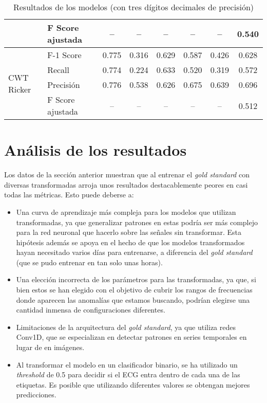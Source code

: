 \begin{table}[htbp]
{\begin{tabular}{|l|l|ccccc|c|}
		& F Score ajustada  & --    & --    & --    & --    & --    & 0.540 \\
		\midrule
		\multirow{4}{*}{CWT Ricker} 
		& F-1 Score         & 0.775    & 0.316    & 0.629    & 0.587    & 0.426    & 0.628    \\
		& Recall            & 0.774    & 0.224    & 0.633    & 0.520    & 0.319    & 0.572    \\
		& Precisión         & 0.776    & 0.538    & 0.626    & 0.675    & 0.639    & 0.696    \\
		& F Score ajustada  & --    & --    & --   & --    & --    & 0.512    \\
		\bottomrule
	\end{tabular}
	}
	\caption{Resultados de los modelos (con tres dígitos decimales de precisión)}
	\label{tab:resultados_modelos}
\end{table}

\section{Análisis de los resultados}
Los datos de la sección anterior muestran que al entrenar el \emph{gold standard} con diversas transformadas arroja unos resultados destacablemente peores en casi todas las métricas. Esto puede deberse a:
\begin{itemize}
	\item Una curva de aprendizaje más compleja para los modelos que utilizan transformadas, ya que generalizar patrones en estas podría ser más complejo para la red neuronal que hacerlo sobre las señales sin transformar. Esta hipótesis además se apoya en el hecho de que los modelos transformados hayan necesitado varios días para entrenarse, a diferencia del \emph{gold standard} (que se pudo entrenar en tan solo unas horas).
	\item Una elección incorrecta de los parámetros para las transformadas, ya que, si bien estos se han elegido con el objetivo de cubrir los rangos de frecuencias donde aparecen las anomalías que estamos buscando, podrían elegirse una cantidad inmensa de configuraciones diferentes.
	\item Limitaciones de la arquitectura del \emph{gold standard}, ya que utiliza redes Conv1D, que se especializan en detectar patrones en series temporales en lugar de en imágenes.
	\item Al transformar el modelo en un clasificador binario, se ha utilizado un \emph{threshold} de 0.5 para decidir si el ECG entra dentro de cada una de las etiquetas. Es posible que utilizando diferentes valores se obtengan mejores predicciones.
\end{itemize}
